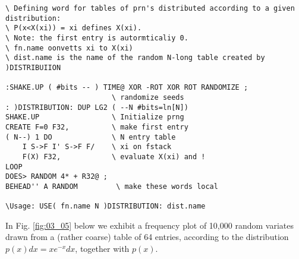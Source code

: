 \begin{verbatim}
\ Defining word for tables of prn's distributed according to a given distribution:
\ P(x<X(xi)) = xi defines X(xi).
\ Note: the first entry is autormticaliy 0.  
\ fn.name oonvetts xi to X(xi) 
\ dist.name is the name of the random N-long table created by )DISTRIBUIION

:SHAKE.UP ( #bits -- ) TIME@ XOR -ROT XOR ROT RANDOMIZE ;
                         \ randomize seeds
: )DISTRIBUTION: DUP LG2 ( --N #bits=ln[N])
SHAKE.UP                 \ Initialize prng
CREATE F=0 F32,          \ make first entry
( N--) 1 DO              \ N entry table
    I S->F I' S->F F/    \ xi on fstack
    F(X) F32,            \ evaluate X(xi) and !
LOOP
DOES> RANDOM 4* + R32@ ;
BEHEAD'' A RANDOM         \ make these words local

\Usage: USE( fn.name N )DISTRIBUTION: dist.name
\end{verbatim}
In Fig. \ref{fig:03_05} below we exhibit a frequency plot of 10,000 random
variates drawn from a (rather coarse) table of 64 entries, according to the
distribution $p(x)dx=xe^{-x}dx$, together with $p(x)$.
